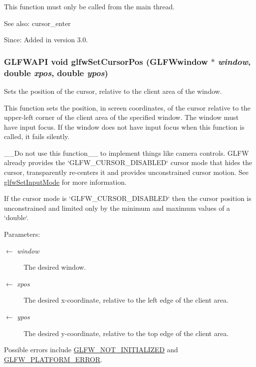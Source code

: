 This function must only be called from the main thread.

\begin{Desc}
\item[See also:]cursor\_\-enter\end{Desc}
\begin{Desc}
\item[Since:]Added in version 3.0. \end{Desc}
\hypertarget{group__input_gaf152cc93418acb0ba342e3f4af922bc}{
\subsubsection[glfwSetCursorPos]{\setlength{\rightskip}{0pt plus 5cm}GLFWAPI void glfwSetCursorPos ({\bf GLFWwindow} $\ast$ {\em window}, \/  double {\em xpos}, \/  double {\em ypos})}}
\label{group__input_gaf152cc93418acb0ba342e3f4af922bc}


Sets the position of the cursor, relative to the client area of the window. 

This function sets the position, in screen coordinates, of the cursor relative to the upper-left corner of the client area of the specified window. The window must have input focus. If the window does not have input focus when this function is called, it fails silently.

\_\-\_\-Do not use this function\_\-\_\- to implement things like camera controls. GLFW already provides the `GLFW\_\-CURSOR\_\-DISABLED` cursor mode that hides the cursor, transparently re-centers it and provides unconstrained cursor motion. See \hyperlink{group__input_ge1eb729d2dd91dc33fd60e150a6e1684}{glfwSetInputMode} for more information.

If the cursor mode is `GLFW\_\-CURSOR\_\-DISABLED` then the cursor position is unconstrained and limited only by the minimum and maximum values of a `double`.

\begin{Desc}
\item[Parameters:]
\begin{description}
\item[\mbox{$\leftarrow$} {\em window}]The desired window. \item[\mbox{$\leftarrow$} {\em xpos}]The desired x-coordinate, relative to the left edge of the client area. \item[\mbox{$\leftarrow$} {\em ypos}]The desired y-coordinate, relative to the top edge of the client area.\end{description}
\end{Desc}
Possible errors include \hyperlink{group__errors_g2374ee02c177f12e1fa76ff3ed15e14a}{GLFW\_\-NOT\_\-INITIALIZED} and \hyperlink{group__errors_gd44162d78100ea5e87cdd38426b8c7a1}{GLFW\_\-PLATFORM\_\-ERROR}.

